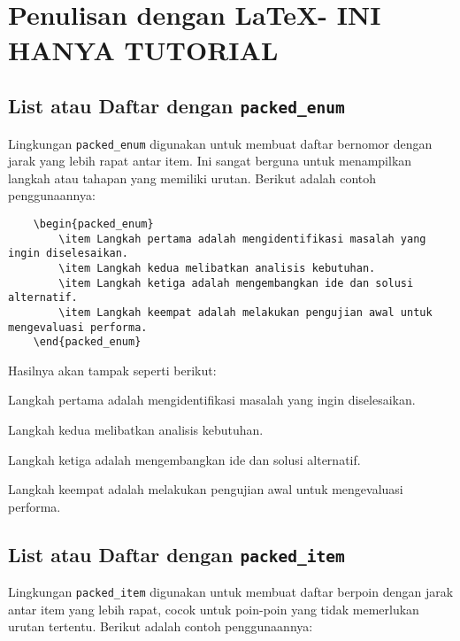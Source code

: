 \chapter[Penulisan dengan \LaTeX - INI HANYA TUTORIAL]{\\ Penulisan dengan \LaTeX  - INI HANYA TUTORIAL}

\section{List atau Daftar dengan \texttt{packed\_enum}}
Lingkungan \texttt{packed\_enum} digunakan untuk membuat daftar bernomor dengan jarak yang lebih rapat antar item. Ini sangat berguna untuk menampilkan langkah atau tahapan yang memiliki urutan. Berikut adalah contoh penggunaannya:

\begin{lstlisting}
    \begin{packed_enum}
        \item Langkah pertama adalah mengidentifikasi masalah yang ingin diselesaikan.
        \item Langkah kedua melibatkan analisis kebutuhan.
        \item Langkah ketiga adalah mengembangkan ide dan solusi alternatif.
        \item Langkah keempat adalah melakukan pengujian awal untuk mengevaluasi performa.
    \end{packed_enum}
\end{lstlisting}
    
Hasilnya akan tampak seperti berikut:
\begin{packed_enum}
    \item Langkah pertama adalah mengidentifikasi masalah yang ingin diselesaikan.
    \item Langkah kedua melibatkan analisis kebutuhan.
    \item Langkah ketiga adalah mengembangkan ide dan solusi alternatif.
    \item Langkah keempat adalah melakukan pengujian awal untuk mengevaluasi performa.
\end{packed_enum}

\section{List atau Daftar dengan \texttt{packed\_item}}
Lingkungan \texttt{packed\_item} digunakan untuk membuat daftar berpoin dengan jarak antar item yang lebih rapat, cocok untuk poin-poin yang tidak memerlukan urutan tertentu. Berikut adalah contoh penggunaannya:

